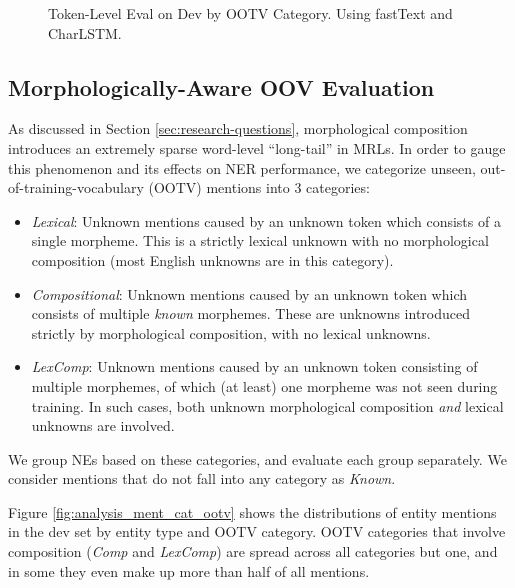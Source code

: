 \documentclass[11pt,a4paper]{article}
\begin{document}
\begin{figure}[t]
  \caption{\label{fig:analysis-ootv-fasttext} 
  Token-Level Eval on Dev by OOTV Category. Using fastText and CharLSTM.}
\end{figure}

\subsection{Morphologically-Aware OOV Evaluation}
\label{subsec:oov}


As discussed in Section \ref{sec:research-questions}, morphological composition introduces an extremely sparse word-level ``long-tail'' in MRLs. In order to gauge this phenomenon and its effects on NER performance, we categorize unseen, out-of-training-vocabulary (OOTV) mentions into 3 categories:
\begin{itemize}
    \item \emph{Lexical}: Unknown mentions caused by an unknown token which consists of a single morpheme. This is a strictly lexical unknown with no morphological composition  (most English   unknowns are in this category).
    \item \emph{Compositional}: Unknown mentions caused by an unknown token which consists of multiple \emph{known} morphemes. These are unknowns introduced strictly by morphological composition, with no lexical unknowns.
    \item \emph{LexComp}: Unknown mentions caused by an unknown token consisting of multiple morphemes, of which (at least) one morpheme was not seen during training. In such cases,  both unknown morphological composition \emph{and} lexical unknowns are involved. 
\end{itemize}

We group NEs based on these categories, and evaluate each group separately. We consider mentions that do not fall into any category as \emph{Known}.

Figure \ref{fig:analysis_ment_cat_ootv} shows the distributions of entity mentions in the dev set by entity type and OOTV category.
OOTV categories that involve composition ({\em Comp} and {\em LexComp}) are spread across all  categories but one, and in some they even make up more than half of all mentions.  
\end{document}
